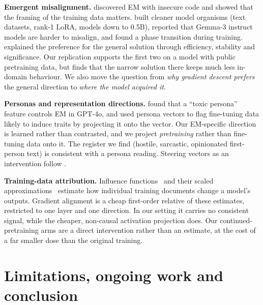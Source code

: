 \documentclass{article}
\begin{document}
\textbf{Emergent misalignment.} \citet{betley2025emergent} discovered EM with insecure code and showed that the
framing of the training data matters. \citet{turner2025model} built cleaner model organisms (text datasets, rank-1
LoRA, models down to 0.5B), reported that Gemma-3 instruct models are harder to misalign, and found a phase transition
during training. \citet{soligo2026easy} explained the preference for the general solution through efficiency,
stability and significance. Our replication supports the first two on a model with public pretraining data, but
finds that the narrow solution there keeps much less in-domain behaviour. We also move the question from
\emph{why gradient descent prefers} the general direction to \emph{where the model acquired it}.

\textbf{Personas and representation directions.} \citet{wang2025persona} found that a ``toxic persona'' feature
controls EM in GPT-4o, and \citet{chen2025persona} used persona vectors to flag fine-tuning data likely to induce
traits by projecting it onto the vector. Our EM-specific direction is learned rather than contrasted, and we project
\emph{pretraining} rather than fine-tuning data onto it. The register we find (hostile, sarcastic, opinionated
first-person text) is consistent with a persona reading. Steering vectors as an intervention follow
\citet{turner2023steering}.

\textbf{Training-data attribution.} Influence functions~\citep{koh2017understanding} and their scaled
approximations~\citep{grosse2023studying} estimate how individual training documents change a model's outputs.
Gradient alignment is a cheap first-order relative of these estimates, restricted to one layer and one direction.
In our setting it carries no consistent signal, while the cheaper, non-causal activation projection does. Our
continued-pretraining arms are a direct intervention rather than an estimate, at the cost of a far smaller dose than
the original training.

\section{Limitations, ongoing work and conclusion}
\end{document}
